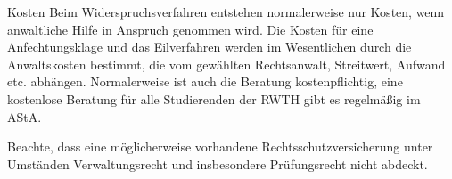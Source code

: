 \begin{artikel}{Kosten}
Beim Widerspruchsverfahren entstehen normalerweise nur Kosten, wenn anwaltliche Hilfe in Anspruch genommen wird. Die Kosten für eine Anfechtungsklage und das Eilverfahren werden im Wesentlichen durch die Anwaltskosten bestimmt, die vom gewählten Rechtsanwalt, Streitwert, Aufwand etc. abhängen. Normalerweise ist auch die Beratung kostenpflichtig, eine kostenlose Beratung für alle Studierenden der RWTH gibt es regelmäßig im AStA.

Beachte, dass eine möglicherweise vorhandene Rechtsschutzversicherung unter Umständen Verwaltungsrecht und insbesondere Prüfungsrecht nicht abdeckt.
\end{artikel}
